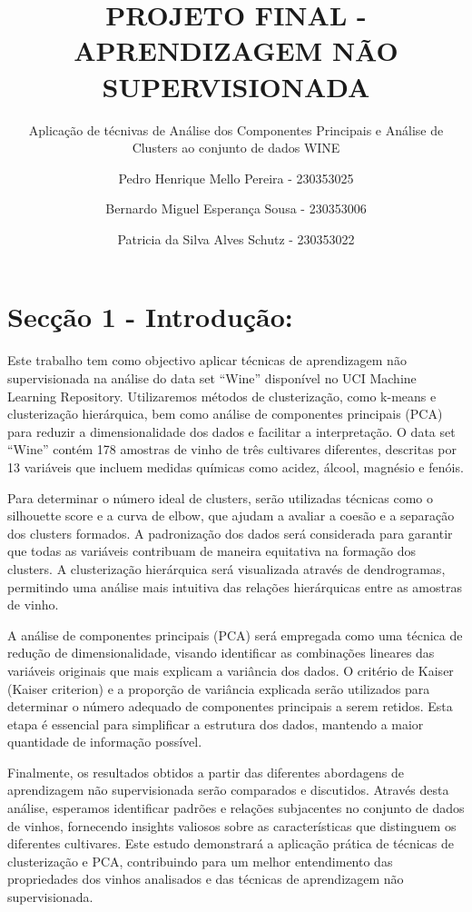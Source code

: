 \documentclass[
  letterpaper,
  DIV=11,
  numbers=noendperiod]{scrartcl}
\title{PROJETO FINAL - APRENDIZAGEM NÃO SUPERVISIONADA}
\subtitle{Aplicação de técnivas de Análise dos Componentes Principais e
Análise de Clusters ao conjunto de dados WINE}
\author{Pedro Henrique Mello Pereira - 230353025 \and Bernardo Miguel
Esperança Sousa - 230353006 \and Patricia da Silva Alves Schutz -
230353022}
\date{}
\renewcommand*\contentsname{Table of contents}
\newcommand\contentsname{Table of contents}
\begin{document}
\maketitle

\renewcommand*\contentsname{Sumário}
{
\hypersetup{linkcolor=}
\setcounter{tocdepth}{3}
\tableofcontents
}
\newpage{}

\section{Secção 1 -
Introdução:}\label{secuxe7uxe3o-1---introduuxe7uxe3o}

Este trabalho tem como objectivo aplicar técnicas de aprendizagem não
supervisionada na análise do data set ``Wine'' disponível no UCI Machine
Learning Repository. Utilizaremos métodos de clusterização, como k-means
e clusterização hierárquica, bem como análise de componentes principais
(PCA) para reduzir a dimensionalidade dos dados e facilitar a
interpretação. O data set ``Wine'' contém 178 amostras de vinho de três
cultivares diferentes, descritas por 13 variáveis que incluem medidas
químicas como acidez, álcool, magnésio e fenóis.

Para determinar o número ideal de clusters, serão utilizadas técnicas
como o silhouette score e a curva de elbow, que ajudam a avaliar a
coesão e a separação dos clusters formados. A padronização dos dados
será considerada para garantir que todas as variáveis contribuam de
maneira equitativa na formação dos clusters. A clusterização hierárquica
será visualizada através de dendrogramas, permitindo uma análise mais
intuitiva das relações hierárquicas entre as amostras de vinho.

A análise de componentes principais (PCA) será empregada como uma
técnica de redução de dimensionalidade, visando identificar as
combinações lineares das variáveis originais que mais explicam a
variância dos dados. O critério de Kaiser (Kaiser criterion) e a
proporção de variância explicada serão utilizados para determinar o
número adequado de componentes principais a serem retidos. Esta etapa é
essencial para simplificar a estrutura dos dados, mantendo a maior
quantidade de informação possível.

Finalmente, os resultados obtidos a partir das diferentes abordagens de
aprendizagem não supervisionada serão comparados e discutidos. Através
desta análise, esperamos identificar padrões e relações subjacentes no
conjunto de dados de vinhos, fornecendo insights valiosos sobre as
características que distinguem os diferentes cultivares. Este estudo
demonstrará a aplicação prática de técnicas de clusterização e PCA,
contribuindo para um melhor entendimento das propriedades dos vinhos
analisados e das técnicas de aprendizagem não supervisionada.
\end{document}
